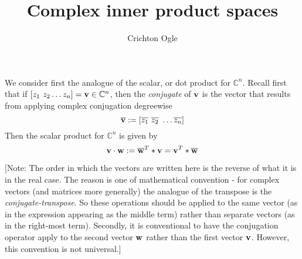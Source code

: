 \documentclass{ximera}
\title{Complex inner product spaces}
\author{Crichton Ogle}
\begin{document}
\begin{abstract}
\end{abstract}
\maketitle

We consider first the analogue of the scalar, or dot product for $\mathbb C^n$. Recall first that if $[z_1\ z_2\dots z_n] = {\bf v}\in\mathbb C^n$, then the {\it conjugate} of $\bf v$ is the vector that results from applying complex conjugation degreewise
\[
\overline{\bf v} := [\overline{z_1}\ \overline{z_2}\ \dots \overline{z_n}]
\]
Then the scalar product for $\mathbb C^n$ is given by
\[
{\bf v}\cdot {\bf w} := \overline{\bf w}^T*{\bf v} = {\bf v}^T*\overline{\bf w}
\]

[Note: The order in which the vectors are written here is the reverse of what it is in the real case. The reason is one of mathematical convention - for complex vectors (and matrices more generally) the analogue of the transpose is the {\it conjugate-transpose}. So these operations should be applied to the same vector (as in the expression appearing as the middle term) rather than separate vectors (as in the right-most term). Secondly, it is conventional to have the conjugation operator apply to the second vector $\bf w$ rather than the first vector $\bf v$. However, this convention is not universal.]
\end{document}
